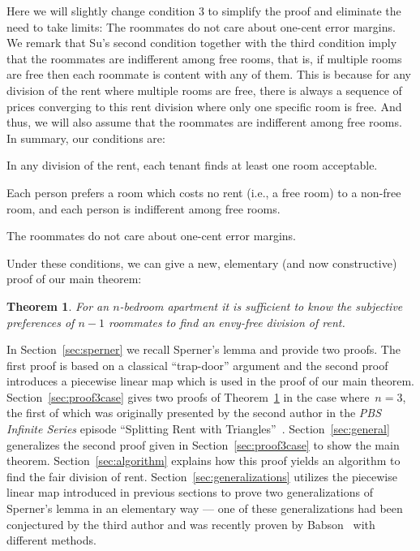 \documentclass[a4paper,10pt,reqno, english]{amsart}
\theoremstyle{plain}
\newtheorem{thm}{Theorem}
\theoremstyle{definition}
\begin{document}
\noindent
Here we will slightly change condition 3 to simplify the proof and eliminate the need to take limits: 
The roommates do not care about one-cent error margins. We remark that Su's second condition
together with the third condition imply that the roommates are indifferent among free rooms, that is, if multiple rooms are free then
each roommate is content with any of them. This is because for any division of the rent where multiple
rooms are free, there is always a sequence of prices converging to this rent division where only one
specific room is free. And thus, we will also assume that the roommates are indifferent among free rooms.
In summary, our conditions are:
\begin{compactenum}[1.]
	\item In any division of the rent, each tenant finds at least one room acceptable.
	\item Each person prefers a room which costs no rent (i.e., a free room) to a non-free room, and each person is indifferent among free rooms.
	\item The roommates do not care about one-cent error margins.
\end{compactenum}


\medskip
\noindent 
Under these conditions, we can give a new, elementary (and now constructive) proof of our main theorem:

\begin{thm}
\label{thm:secret}
	For an $n$-bedroom apartment it is sufficient to know the subjective preferences of $n-1$ roommates to
	find an envy-free division of rent.
\end{thm}

In Section~\ref{sec:sperner} we recall Sperner's lemma and provide two proofs. The first proof is based on a classical ``trap-door'' argument and the second proof introduces a piecewise linear map which is used in the proof of our main theorem. Section~\ref{sec:proof3case} gives two proofs of Theorem~\ref{thm:secret} in the case where~${n=3}$, the first of which was originally presented by the second author in the \emph{PBS Infinite Series} episode ``Splitting Rent with Triangles''~\cite{houston-edwards2017}. Section~\ref{sec:general} generalizes the second proof given in Section~\ref{sec:proof3case} to show the main theorem. Section~\ref{sec:algorithm} explains how this proof yields an algorithm to find the fair division of rent. Section~\ref{sec:generalizations} utilizes the piecewise linear map introduced in previous sections to prove two generalizations of Sperner's lemma in an elementary way --- one of these generalizations had been conjectured by the third author and was recently proven by Babson~\cite{babson2012} with different methods.
\end{document}
